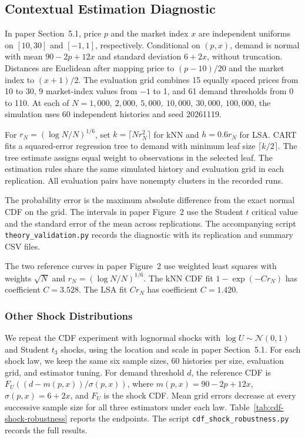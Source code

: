\subsection{Contextual Estimation Diagnostic}\label{app:probability-design}

In paper Section~5.1, price \(p\) and the market index \(x\) are independent uniforms on \([10,30]\) and \([-1,1]\), respectively. Conditional on \((p,x)\), demand is normal with mean \(90-2p+12x\) and standard deviation \(6+2x\), without truncation. Distances are Euclidean after mapping price to \((p-10)/20\) and the market index to \((x+1)/2\). The evaluation grid combines 15 equally spaced prices from 10 to 30, 9 market-index values from \(-1\) to 1, and 61 demand thresholds from 0 to 110. At each of \(N=1{,}000,\ 2{,}000,\ 5{,}000,\ 10{,}000,\ 30{,}000,\ 100{,}000\), the simulation uses 60 independent histories and seed 20261119.

For \(r_N=(\log N/N)^{1/6}\), set \(k=\lceil Nr_N^2\rceil\) for kNN and \(h=0.6r_N\) for LSA. CART fits a squared-error regression tree to demand with minimum leaf size \(\lceil k/2\rceil\). The tree estimate assigns equal weight to observations in the selected leaf. The estimation rules share the same simulated history and evaluation grid in each replication. All evaluation pairs have nonempty clusters in the recorded runs.

The probability error is the maximum absolute difference from the exact normal CDF on the grid. The intervals in paper Figure~2 use the Student \(t\) critical value and the standard error of the mean across replications. The accompanying script \texttt{theory\_validation.py} records the diagnostic with its replication and summary CSV files.

The two reference curves in paper Figure~2 use weighted least squares with weights \(\sqrt N\) and \(r_N=(\log N/N)^{1/6}\). The kNN CDF fit \(1-\exp(-C r_N)\) has coefficient \(C=3.528\). The LSA fit \(C r_N\) has coefficient \(C=1.420\).

\subsubsection{Other Shock Distributions}

We repeat the CDF experiment with lognormal shocks with \(\log U\sim\mathcal N(0,1)\) and Student \(t_3\) shocks, using the location and scale in paper Section~5.1. For each shock law, we keep the same six sample sizes, 60 histories per size, evaluation grid, and estimator tuning. For demand threshold \(d\), the reference CDF is \(F_U((d-m(p,x))/\sigma(p,x))\), where \(m(p,x)=90-2p+12x\), \(\sigma(p,x)=6+2x\), and \(F_U\) is the shock CDF. Mean grid errors decrease at every successive sample size for all three estimators under each law. Table~\ref{tab:cdf-shock-robustness} reports the endpoints. The script \texttt{cdf\_shock\_robustness.py} records the full results.

